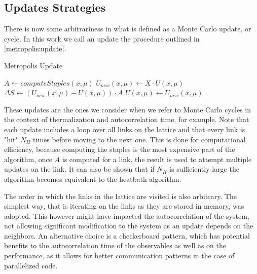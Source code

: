 \begin{figure}[!htb]

    \label{fig:staples}
\end{figure}


\subsection{Updates Strategies}
There is now some arbitrariness in what is defined as a Monte Carlo update, or cycle. In this work we call an update the procedure outlined in \cref{metropolis:update}. 
\begin{algorithm}[bht!]
    \caption{Metropolis Update}\label{metropolis:update}
    \begin{algorithmic}[1]
        \State $A \gets computeStaples(x,\mu)$     
            \State $U_{new}(x,\mu)  \gets X\cdot U(x,\mu)$  
            \State $\Delta S \gets (U_{new}(x,\mu)  - U(x,\mu) )\cdot A$
                \State $U(x,\mu)  \gets U_{new}(x,\mu)$
            \EndIf
        \EndFor
    \EndFor
\end{algorithmic}
\end{algorithm}
These updates are the ones we consider when we refer to Monte Carlo cycles in the context of thermalization and autocorrelation time, for example. Note that each update includes a loop over all links on the lattice and that every link is "hit" $N_H$ times before moving to the next one. This is done for computational efficiency, because computing the staples is the most expensive part of the algorithm, once $A$ is computed for a link, the result is used to attempt multiple updates on the link. It can also be shown that if $N_H$ is sufficiently large the algorithm becomes equivalent to the heatbath algorithm. 

The order in which the links in the lattice are visited is also arbitrary. The simplest way, that is iterating on the links as they are stored in memory, was adopted. This however might have impacted the autocorrelation of the system, not allowing significant modification to the system as an update depends on the neighbors. An alternative choice is a checkerboard pattern, which has potential benefits to the autocorrelation time of the observables as well as on the performance, as it allows for better communication patterns in the case of parallelized code. 

